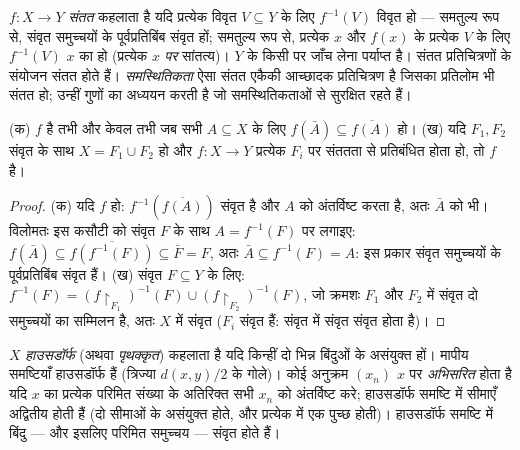 \begin{definition}\label{def:b3:topology:continuity}
$f \colon X \to Y$ \emph{संतत} कहलाता है यदि प्रत्येक
विवृत $V \subseteq Y$ के लिए $f^{-1}(V)$ विवृत हो --- समतुल्य रूप से, संवृत
समुच्चयों के पूर्वप्रतिबिंब संवृत हों; समतुल्य रूप से, प्रत्येक
$x$ और $f(x)$ के प्रत्येक  $V$ के लिए $f^{-1}(V)$ $x$ का
 हो (प्रत्येक $x$ \emph{पर} सांतत्य)। $Y$ के किसी 
पर जाँच लेना पर्याप्त है। संतत प्रतिचित्रणों के संयोजन संतत होते
हैं। \emph{समस्थितिकता} ऐसा संतत एकैकी आच्छादक
प्रतिचित्रण है जिसका प्रतिलोम भी संतत हो;  उन्हीं गुणों
का अध्ययन करती है जो समस्थितिकताओं से सुरक्षित रहते हैं।
\end{definition}

\begin{proposition}[सांतत्य बनाम संवृति; जोड़ना]
\label{prop:b3:topology:gluing}
(क) $f$  है तभी और केवल तभी जब सभी $A \subseteq X$ के लिए $f(\bar A) \subseteq \overline{f(A)}$ हो।
(ख) यदि $F_1, F_2$ संवृत के साथ $X = F_1 \cup F_2$ हो और $f\colon X
\to Y$ प्रत्येक $F_i$ पर
संततता से प्रतिबंधित होता हो, तो $f$  है।
\end{proposition}

\begin{proof}
(क) यदि $f$  हो: $f^{-1}(\overline{f(A)})$ संवृत है और $A$ को अंतर्विष्ट करता
है, अतः $\bar A$ को भी। विलोमतः इस कसौटी को संवृत $F$ के साथ $A = f^{-1}(F)$ पर
लगाइए: $f(\bar A) \subseteq
\overline{f(f^{-1}(F))} \subseteq \bar F = F$, अतः $\bar A
\subseteq f^{-1}(F) = A$: इस प्रकार संवृत समुच्चयों के पूर्वप्रतिबिंब
संवृत हैं।
(ख) संवृत $F \subseteq Y$ के लिए: $f^{-1}(F) =
(f\restriction_{F_1})^{-1}(F) \cup (f\restriction_{F_2})^{-1}
(F)$, जो क्रमशः $F_1$ और $F_2$ में संवृत दो
समुच्चयों का सम्मिलन है, अतः $X$ में संवृत ($F_i$ संवृत हैं:
संवृत में संवृत संवृत होता है)।
\end{proof}

\begin{definition}\label{def:b3:topology:hausdorff}
$X$ \emph{हाउसडॉर्फ} (अथवा
\emph{पृथक्कृत}) कहलाता है यदि किन्हीं दो भिन्न बिंदुओं के
असंयुक्त  हों। मापीय समष्टियाँ हाउसडॉर्फ हैं (त्रिज्या
$d(x,y)/2$ के गोले)। कोई अनुक्रम $(x_n)$ $x$ पर \emph{अभिसरित} होता है
यदि $x$ का प्रत्येक  परिमित संख्या के अतिरिक्त सभी $x_n$
को अंतर्विष्ट करे; हाउसडॉर्फ समष्टि में सीमाएँ अद्वितीय होती हैं
(दो सीमाओं के असंयुक्त  होते, और प्रत्येक में एक पुच्छ
होती)। हाउसडॉर्फ समष्टि में बिंदु --- और इसलिए परिमित समुच्चय ---
संवृत होते हैं।
\end{definition}

